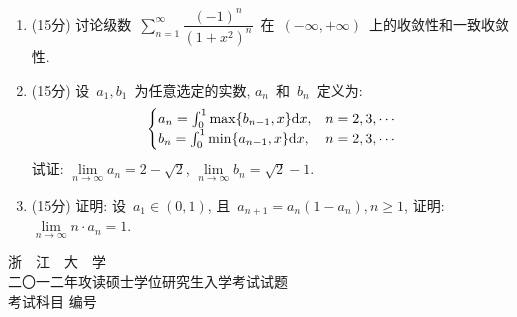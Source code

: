 \documentclass[UTF8,a4paper,11pt]{article}
\begin{document}
\begin{enumerate}
	      \vspace{2em}
	\item (15分) 讨论级数~$\sum_{n=1}^{\infty}\dfrac{(-1)^n}{(1+x^2)^n}$~在~$(-\infty,+\infty)$~上的收敛性和一致收敛性.
	      \vspace{2em}
	\item (15分) 设~$a_1,b_1$~为任意选定的实数, $a_n$~和~$b_n$~定义为:
	      \begin{equation*}
		      \begin{cases} a_n=\int_0^1\max\{b_{n-1},x\}\mathrm{d}x, &n=2,3,\cdots\\ b_n=\int_0^1\min\{a_{n-1},x\}\mathrm{d}x, &n=2,3,\cdots\end{cases}
	      \end{equation*}
	      试证: $\lim\limits_{n\to\infty} a_n=2-\sqrt{2}$, $\lim\limits_{n\to\infty} b_n=\sqrt{2}-1$.
	      \vspace{2em}
	\item (15分) 证明: 设~$a_1\in(0,1)$, 且~$a_{n+1}=a_n(1-a_n), n\geqslant 1$, 证明: $\lim\limits_{n\to\infty} n\cdot a_n=1$.
	      \vspace{2em}
\end{enumerate}


\newpage
\setcounter{page}{1}

\begin{center}
	{\Huge 浙~~江~~大~~学}\\
	\setlength{\parskip}{5pt}
	{\Large 二〇一二年攻读硕士学位研究生入学考试试题}\\
	\setlength{\parskip}{10 pt}
	{\Large 考试科目\underline{} 编号\underline{}}
\end{center}
\end{document}
